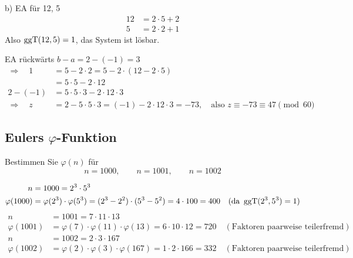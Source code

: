 \begin{loesung}
b) EA für 12, 5
\begin{align*}
12 &= 2 \cdot 5 + 2\\
5 &= 2 \cdot 2 + 1
\end{align*}
Also $\operatorname{ggT}(12, 5) = 1$, das System ist lösbar.

EA rückwärts \qquad $b - a = 2 - (-1) = 3$
\begin{align*}
\Rightarrow\quad 1 &= 5 - 2 \cdot 2 = 5 - 2 \cdot (12 - 2 \cdot 5)\\
&= 5 \cdot 5 - 2 \cdot 12\\
2 - (-1) &= 5 \cdot 5 \cdot 3 - 2 \cdot 12 \cdot 3\\
\Rightarrow\quad z &= 2 - 5 \cdot 5 \cdot 3 = (-1) - 2 \cdot 12 \cdot 3 = -73, \quad \text{also } z \equiv -73 \equiv 47 \pmod{60}
\end{align*}
\end{loesung}

\subsection{Eulers $\varphi$-Funktion}

\begin{aufgabe}[Aufgabe 2]
Bestimmen Sie $\varphi(n)$ für
\[
n = 1000, \qquad n = 1001, \qquad n = 1002
\]
\end{aufgabe}

\begin{loesung}
\begin{align*}
n &= 1000 = 2^3 \cdot 5^3\\
\varphi(1000) &= \varphi(2^3) \cdot \varphi(5^3) = (2^3 - 2^2) \cdot (5^3 - 5^2) = 4 \cdot 100 = 400 \quad (\text{da } \operatorname{ggT}(2^3, 5^3) = 1)
\end{align*}
\begin{align*}
n &= 1001 = 7 \cdot 11 \cdot 13\\
\varphi(1001) &= \varphi(7) \cdot \varphi(11) \cdot \varphi(13) = 6 \cdot 10 \cdot 12 = 720 \quad (\text{Faktoren paarweise teilerfremd})
\end{align*}
\begin{align*}
n &= 1002 = 2 \cdot 3 \cdot 167\\
\varphi(1002) &= \varphi(2) \cdot \varphi(3) \cdot \varphi(167) = 1 \cdot 2 \cdot 166 = 332 \quad (\text{Faktoren paarweise teilerfremd})
\end{align*}
\end{loesung}

